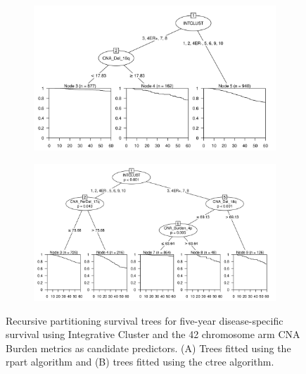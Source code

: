 \begin{figure}[!h]
\centering

\vspace{0.5cm}

\begin{subfigure}{\textwidth}
\subcaption{}
\includegraphics[width=1\textwidth]{../figures/Chapter_3/PA_PartyKit_Survival_Burden_FiveYearDSS_INTCLUST.png}
\end{subfigure}

\vspace{2cm}

\begin{subfigure}{\textwidth}
\subcaption{}
\includegraphics[width=1\textwidth]{../figures/Chapter_3/PA_Ctree_Survival_Burden_FiveYearDSS_INTCLUST.png}
\end{subfigure}

\vspace{0.5cm}

\caption[Recursive partitioning survival trees for five-year disease-specific survival using Integrative Cluster and the 42 chromosome arm CNA Burden metrics as candidate predictors.]{Recursive partitioning survival trees for five-year disease-specific survival using Integrative Cluster and the 42 chromosome arm CNA Burden metrics as candidate predictors. (A) Trees fitted using the rpart algorithm and (B) trees fitted using the ctree algorithm.}
\label{fig:INTCLUST_PA_CNA_Burden_FiveYearDSS}
\end{figure}


